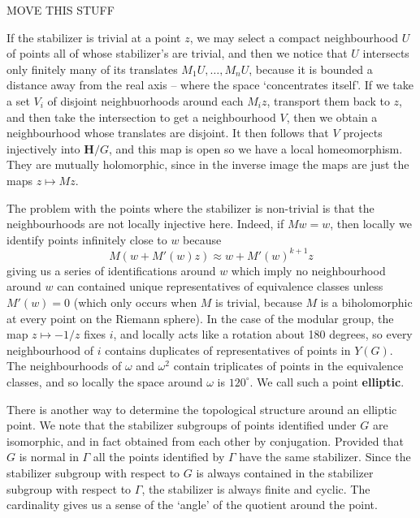MOVE THIS STUFF

If the stabilizer is trivial at a point $z$, we may select a compact neighbourhood $U$ of points all of whose stabilizer's are trivial, and then we notice that $U$ intersects only finitely many of its translates $M_1U ,\dots, M_nU$, because it is bounded a distance away from the real axis -- where the space `concentrates itself'. If we take a set $V_i$ of disjoint neighbuorhoods around each $M_iz$, transport them back to $z$, and then take the intersection to get a neighbourhood $V$, then we obtain a neighbourhood whose translates are disjoint. It then follows that $V$ projects injectively into $\mathbf{H}/G$, and this map is open so we have a local homeomorphism. They are mutually holomorphic, since in the inverse image the maps are just the maps $z \mapsto Mz$.

The problem with the points where the stabilizer is non-trivial is that the neighbourhoods are not locally injective here. Indeed, if $Mw = w$, then locally we identify points infinitely close to $w$ because
%
\[ M(w + M'(w)z) \approx w + M'(w)^{k+1}z \]
%
giving us a series of identifications around $w$ which imply no neighbourhood around $w$ can contained unique representatives of equivalence classes unless $M'(w) = 0$ (which only occurs when $M$ is trivial, because $M$ is a biholomorphic at every point on the Riemann sphere). In the case of the modular group, the map $z \mapsto -1/z$ fixes $i$, and locally acts like a rotation about 180 degrees, so every neighbourhood of $i$ contains duplicates of representatives of points in $Y(G)$. The neighbourhoods of $\omega$ and $\omega^2$ contain triplicates of points in the equivalence classes, and so locally the space around $\omega$ is $120^\circ$. We call such a point {\bf elliptic}.

There is another way to determine the topological structure around an elliptic point. We note that the stabilizer subgroups of points identified under $G$ are isomorphic, and in fact obtained from each other by conjugation. Provided that $G$ is normal in $\Gamma$ all the points identified by $\Gamma$ have the same stabilizer. Since the stabilizer subgroup with respect to $G$ is always contained in the stabilizer subgroup with respect to $\Gamma$, the stabilizer is always finite and cyclic. The cardinality gives us a sense of the `angle' of the quotient around the point.

